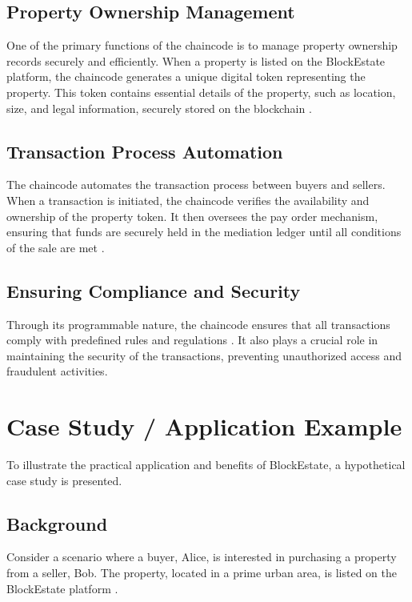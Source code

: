 \documentclass[3p,times]{elsarticle}
\begin{document}
\subsection{Property Ownership Management}

One of the primary functions of the chaincode is to manage property ownership records securely and efficiently. When a property is listed on the BlockEstate platform, the chaincode generates a unique digital token representing the property. This token contains essential details of the property, such as location, size, and legal information, securely stored on the blockchain  \cite{hermansson2020real}.

\subsection{Transaction Process Automation}

The chaincode automates the transaction process between buyers and sellers. When a transaction is initiated, the chaincode verifies the availability and ownership of the property token. It then oversees the pay order mechanism, ensuring that funds are securely held in the mediation ledger until all conditions of the sale are met \cite{saull2020can}.

\subsection{Ensuring Compliance and Security}

Through its programmable nature, the chaincode ensures that all transactions comply with predefined rules and regulations \cite{lindholm2021blockchain}. It also plays a crucial role in maintaining the security of the transactions, preventing unauthorized access and fraudulent activities.


\section{Case Study / Application Example}

To illustrate the practical application and benefits of BlockEstate, a hypothetical case study is presented.

\subsection{Background}

Consider a scenario where a buyer, Alice, is interested in purchasing a property from a seller, Bob. The property, located in a prime urban area, is listed on the BlockEstate platform \cite{li2019blockchain}.
\end{document}
